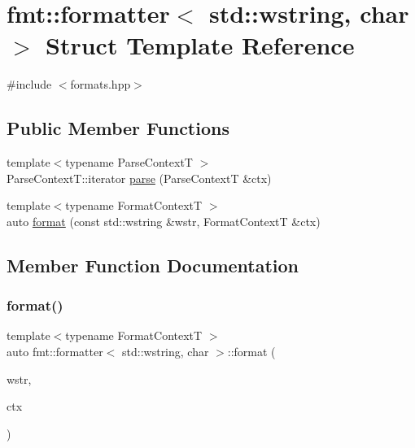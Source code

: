 \hypertarget{structfmt_1_1formatter_3_01std_1_1wstring_00_01char_01_4}{}\section{fmt\+:\+:formatter$<$ std\+:\+:wstring, char $>$ Struct Template Reference}
\label{structfmt_1_1formatter_3_01std_1_1wstring_00_01char_01_4}


{\ttfamily \#include $<$formats.\+hpp$>$}

\subsection*{Public Member Functions}
\begin{DoxyCompactItemize}
\item 
{\footnotesize template$<$typename Parse\+ContextT $>$ }\\Parse\+Context\+T\+::iterator \mbox{\hyperlink{structfmt_1_1formatter_3_01std_1_1wstring_00_01char_01_4_a636d7b08e20799058c242bc4d6dd8fba}{parse}} (Parse\+ContextT \&ctx)
\item 
{\footnotesize template$<$typename Format\+ContextT $>$ }\\auto \mbox{\hyperlink{structfmt_1_1formatter_3_01std_1_1wstring_00_01char_01_4_ab5e14bd7ab7e61a4d8bca4d6b74ffb76}{format}} (const std\+::wstring \&wstr, Format\+ContextT \&ctx)
\end{DoxyCompactItemize}


\subsection{Member Function Documentation}
\mbox{\label{structfmt_1_1formatter_3_01std_1_1wstring_00_01char_01_4_ab5e14bd7ab7e61a4d8bca4d6b74ffb76}} 
\subsubsection{\texorpdfstring{format()}{format()}}
{\footnotesize\ttfamily template$<$typename Format\+ContextT $>$ \\
auto fmt\+::formatter$<$ std\+::wstring, char $>$\+::format (\begin{DoxyParamCaption}\item[{const std\+::wstring \&}]{wstr,  }\item[{Format\+ContextT \&}]{ctx }\end{DoxyParamCaption})}

